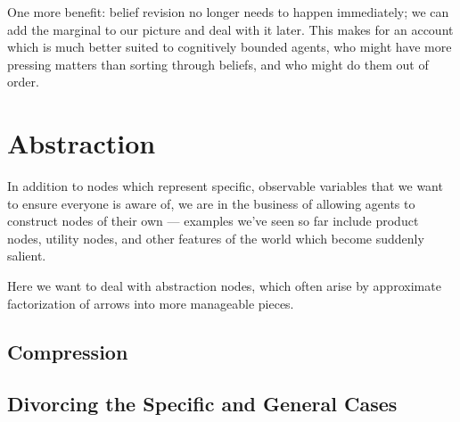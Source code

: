 \documentclass{article}
\begin{document}
	
	One more benefit: belief revision no longer needs to happen immediately; we can add the marginal to our picture and deal with it later. This makes for an account which is much better suited to cognitively bounded agents, who might have more pressing matters than sorting through beliefs, and who might do them out of order.
	
	\section{Abstraction}
	In addition to nodes which represent specific, observable variables that we want to ensure everyone is aware of, we are in the business of allowing agents to construct nodes of their own --- examples we've seen so far include product nodes, utility nodes, and other features of the world which become suddenly salient.
	
	Here we want to deal with abstraction nodes, which often arise by approximate factorization of arrows into more manageable pieces.

	\subsection{Compression}
	\subsection{Divorcing the Specific and General Cases}
	

	
	
\end{document}
